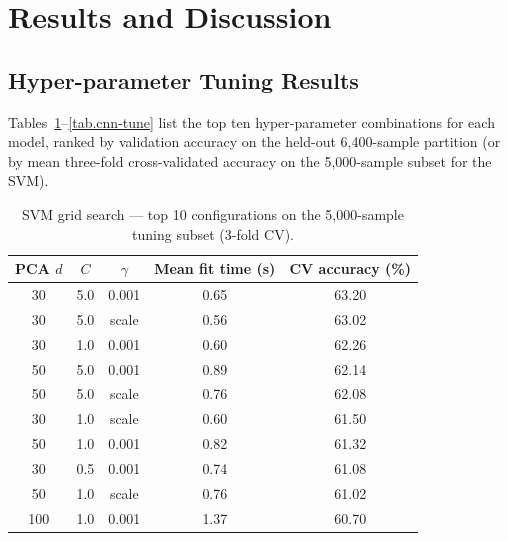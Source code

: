 \documentclass[../main.tex]{subfiles}
\begin{document}
\section{Results and Discussion}\label{section.4}

\subsection{Hyper-parameter Tuning Results}
\noindent
Tables~\ref{tab.svm-tune}--\ref{tab.cnn-tune} list the top ten
hyper-parameter combinations for each model, ranked by validation accuracy
on the held-out 6{,}400-sample partition (or by mean three-fold
cross-validated accuracy on the 5{,}000-sample subset for the SVM).

\begin{table}[H]
    \centering
    \caption{SVM grid search — top 10 configurations on the 5{,}000-sample
    tuning subset (3-fold CV).}
    \label{tab.svm-tune}
    \begin{tabular}{ccccc}
        \toprule
        \textbf{PCA $d$} & \textbf{$C$} & \textbf{$\gamma$} &
        \textbf{Mean fit time (s)} & \textbf{CV accuracy (\%)} \\
        \midrule
        30 & 5.0 & 0.001 & 0.65 & 63.20 \\
        30 & 5.0 & scale & 0.56 & 63.02 \\
        30 & 1.0 & 0.001 & 0.60 & 62.26 \\
        50 & 5.0 & 0.001 & 0.89 & 62.14 \\
        50 & 5.0 & scale & 0.76 & 62.08 \\
        30 & 1.0 & scale & 0.60 & 61.50 \\
        50 & 1.0 & 0.001 & 0.82 & 61.32 \\
        30 & 0.5 & 0.001 & 0.74 & 61.08 \\
        50 & 1.0 & scale & 0.76 & 61.02 \\
        100 & 1.0 & 0.001 & 1.37 & 60.70 \\
        \bottomrule
    \end{tabular}
\end{table}
\end{document}
